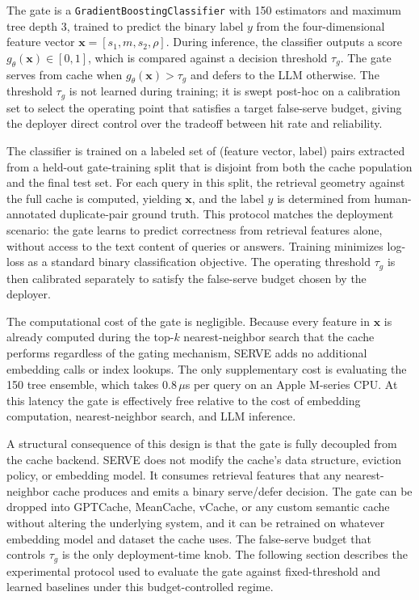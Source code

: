 The gate is a \texttt{GradientBoostingClassifier} \cite{friedman2001greedy} with 150 estimators and maximum tree depth 3, trained to predict the binary label $y$ from the four-dimensional feature vector $\mathbf{x} = [s_1, m, s_2, \rho]$.
During inference, the classifier outputs a score $g_\theta(\mathbf{x}) \in [0,1]$, which is compared against a decision threshold $\tau_g$. The gate serves from cache when $g_\theta(\mathbf{x}) > \tau_g$ and defers to the LLM otherwise. The threshold $\tau_g$ is not learned during training; it is swept post-hoc on a calibration set to select the operating point that satisfies a target false-serve budget, giving the deployer direct control over the tradeoff between hit rate and reliability.

The classifier is trained on a labeled set of (feature vector, label) pairs extracted from a held-out gate-training split that is disjoint from both the cache population and the final test set. For each query in this split, the retrieval geometry against the full cache is computed, yielding $\mathbf{x}$, and the label $y$ is determined from human-annotated duplicate-pair ground truth. This protocol matches the deployment scenario: the gate learns to predict correctness from retrieval features alone, without access to the text content of queries or answers. Training minimizes log-loss as a standard binary classification objective. The operating threshold $\tau_g$ is then calibrated separately to satisfy the false-serve budget chosen by the deployer.

The computational cost of the gate is negligible. Because every feature in $\mathbf{x}$ is already computed during the top-$k$ nearest-neighbor search that the cache performs regardless of the gating mechanism, SERVE adds no additional embedding calls or index lookups. The only supplementary cost is evaluating the 150 tree ensemble, which takes 0.8\,$\mu$s per query on an Apple M-series CPU.
At this latency the gate is effectively free relative to the cost of embedding computation, nearest-neighbor search, and LLM inference.

A structural consequence of this design is that the gate is fully decoupled from the cache backend. SERVE does not modify the cache's data structure, eviction policy, or embedding model. It consumes retrieval features that any nearest-neighbor cache produces and emits a binary serve/defer decision. The gate can be dropped into GPTCache, MeanCache, vCache, or any custom semantic cache without altering the underlying system, and it can be retrained on whatever embedding model and dataset the cache uses. The false-serve budget that controls $\tau_g$ is the only deployment-time knob. The following section describes the experimental protocol used to evaluate the gate against fixed-threshold and learned baselines under this budget-controlled regime.
